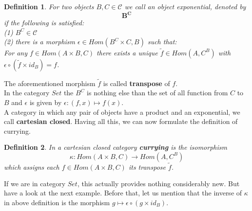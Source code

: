 \documentclass[17pt]{extarticle}
\newtheorem*{definition*}{Definition}
\begin{document}
\begin{definition*}
	For two objects $B, C\in\mathcal{C}$ we call an object exponential, denoted by
	$$\mathbf{B^C}$$
	if the following is satisfied:\\
	(1) $B^C\in\mathcal{C}$\\
	(2) there is a morphism $\epsilon\in Hom(B^C\times C, B)$ such that:\\
	For any $f\in Hom(A\times B, C)$ there exists a unique $\tilde{f}\in Hom(A, C^B)$ with $\epsilon\circ(\tilde{f}\times id_B)=f$.
\end{definition*}
The aforementioned morphism $\tilde{f}$ is called \textbf{transpose} of $f$.\\
In the category $Set$ the $B^C$ is nothing else than the set of all function from $C$ to $B$ and $\epsilon$ is given by $\epsilon:(f, x)\mapsto f(x)$.\\

A category in which any pair of objects have a product and an exponential, we call \textbf{cartesian closed}.
Having all this, we can now formulate the definition of currying.\\
	
\begin{definition*}
	In a cartesian closed category \textbf{currying} is the isomorphism
	\begin{equation*}
		\kappa:Hom(A\times B, C)\rightarrow Hom(A, C^B)
	\end{equation*}
	which assigns each $f\in Hom(A\times B, C)$ its transpose $\tilde{f}$.
\end{definition*}

If we are in category $Set$, this actually provides nothing considerably new. But have a look at the next example. Before that, let us mention that the inverse of $\kappa$ in above definition is the morphism $g\mapsto\epsilon\circ(g\times id_B)$.\\
\end{document}
